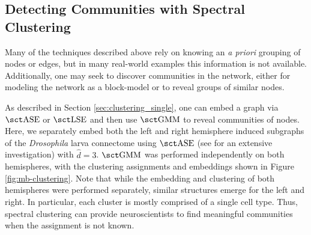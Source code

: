 \subsection{Detecting Communities with Spectral Clustering}
Many of the techniques described above rely on knowing an \textit{a priori} grouping of nodes or edges, but in many real-world examples this information is not available. Additionally, one may seek to discover communities in the network, either for modeling the network as a block-model or to reveal groups of similar nodes. 

As described in Section \ref{sec:clustering_single}, one can embed a graph via $\ase$ or $\lse$ and then use $\gmm$ to reveal communities of nodes. Here, we separately embed both the left and right hemisphere induced subgraphs of the \textit{Drosophila} larva connectome using $\ase$ (see \cite{priebe2017semiparametric} for an extensive investigation) with $\hat d= 3$. $\gmm$ was performed independently on both hemispheres, with the clustering assignments and embeddings shown in Figure \ref{fig:mb-clustering}. Note that while the embedding and clustering of both hemispheres were performed separately, similar structures emerge for the left and right. In particular, each cluster is mostly comprised of a single cell type. Thus, spectral clustering can provide neuroscientists to find meaningful communities when the assignment is not known. 

